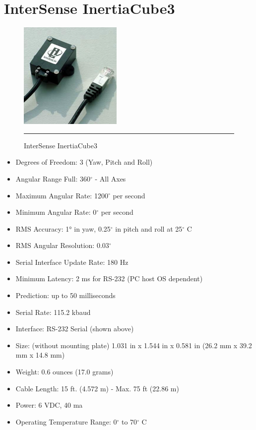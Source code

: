 \chapter{InterSense InertiaCube3}
\label{AppendixD}

\begin{figure}[htbp]
  \centering
    \includegraphics{./Primitives/inertiacube3.png}
    \rule{35em}{0.5pt}
  \caption[InterSense InertiaCube3]{InterSense InertiaCube3}
\end{figure}

\begin{itemize}
	\item Degrees of Freedom: 3 (Yaw, Pitch and Roll) 
	\item Angular Range Full: 360$^\circ$ - All Axes 
	\item Maximum Angular Rate: 1200$^\circ$ per second 
	\item Minimum Angular Rate: 0$^\circ$ per second 
	\item RMS Accuracy: 1° in yaw, 0.25$^\circ$ in pitch and roll at 25$^\circ$ C 
	\item RMS Angular Resolution: 0.03$^\circ$
	\item Serial Interface Update Rate: 180 Hz
	\item Minimum Latency: 2 ms for RS-232 (PC host OS dependent) 
	\item Prediction: up to 50 milliseconds 
	\item Serial Rate: 115.2 kbaud 
	\item Interface: RS-232 Serial (shown above) 
	\item Size: (without mounting plate) 1.031 in x 1.544 in x 0.581 in (26.2 mm x 39.2 mm x 14.8 mm) 
	\item Weight: 0.6 ounces (17.0 grams) 
	\item Cable Length: 15 ft. (4.572 m) - Max. 75 ft (22.86 m) 
	\item Power: 6 VDC, 40 ma 
	\item Operating Temperature Range: 0$^\circ$ to 70$^\circ$ C 
\end{itemize}
